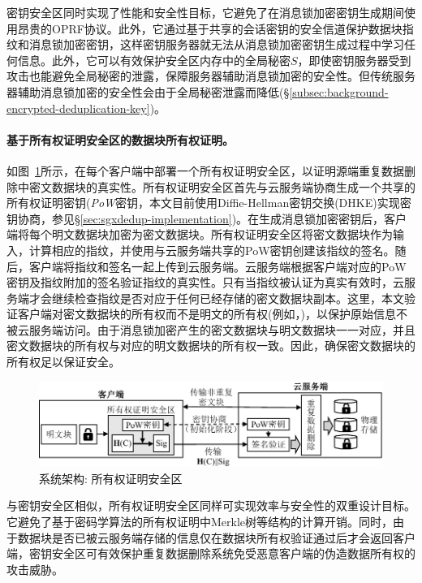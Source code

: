 密钥安全区同时实现了性能和安全性目标，它避免了在消息锁加密密钥生成期间使用昂贵的OPRF协议。此外，它通过基于共享的会话密钥的安全信道保护数据块指纹和消息锁加密密钥，这样密钥服务器就无法从消息锁加密密钥生成过程中学习任何信息。此外，它可以有效保护安全区内存中的全局秘密$S$，即使密钥服务器受到攻击也能避免全局秘密的泄露，保障服务器辅助消息锁加密的安全性。但传统服务器辅助消息锁加密的安全性会由于全局秘密泄露而降低(\S\ref{subsec:background-encrypted-deduplication-key})。



\paragraph*{基于所有权证明安全区的数据块所有权证明。}如图~\ref{fig:sgxdedup-overview-pow}所示，\sysnameS 在每个客户端中部署一个所有权证明安全区，以证明源端重复数据删除中密文数据块的真实性。所有权证明安全区首先与云服务端协商生成一个共享的所有权证明密钥(\textit{PoW}密钥，本文目前使用Diffie-Hellman密钥交换(DHKE)实现密钥协商，参见\S\ref{sec:sgxdedup-implementation})。在生成消息锁加密密钥后，客户端将每个明文数据块加密为密文数据块。所有权证明安全区将密文数据块作为输入，计算相应的指纹，并使用与云服务端共享的PoW密钥创建该指纹的签名。随后，客户端将指纹和签名一起上传到云服务端。云服务端根据客户端对应的PoW密钥及指纹附加的签名验证指纹的真实性。只有当指纹被认证为真实有效时，云服务端才会继续检查指纹是否对应于任何已经存储的密文数据块副本。这里，本文验证客户端对密文数据块的所有权而不是明文的所有权(例如，)，以保护原始信息不被云服务端访问。由于消息锁加密产生的密文数据块与明文数据块一一对应，并且密文数据块的所有权与对应的明文数据块的所有权一致。因此，确保密文数据块的所有权足以保证安全。

\begin{figure}[!htb]
  \centering
  \includegraphics[width=\textwidth]{pic/sgxdedup/pow.pdf}
  \caption{\sysnameS 系统架构: 所有权证明安全区}
  \label{fig:sgxdedup-overview-pow}
\end{figure}


与密钥安全区相似，所有权证明安全区同样可实现效率与安全性的双重设计目标。它避免了基于密码学算法的所有权证明中Merkle树等结构的计算开销。同时，由于数据块是否已被云服务端存储的信息仅在数据块所有权验证通过后才会返回客户端，密钥安全区可有效保护重复数据删除系统免受恶意客户端的伪造数据所有权的攻击威胁。

